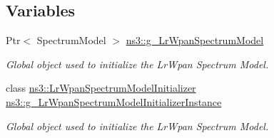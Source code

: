 \subsection*{Variables}
\begin{DoxyCompactItemize}
\item 
Ptr$<$ Spectrum\+Model $>$ \hyperlink{namespacens3_a42737ccd2a2a0c75325fbf6abfffda10}{ns3\+::g\+\_\+\+Lr\+Wpan\+Spectrum\+Model}
\begin{DoxyCompactList}\small\item\em Global object used to initialize the Lr\+Wpan Spectrum Model. \end{DoxyCompactList}\item 
class \hyperlink{classns3_1_1LrWpanSpectrumModelInitializer}{ns3\+::\+Lr\+Wpan\+Spectrum\+Model\+Initializer} \hyperlink{group__lr-wpan_ga392425659812b34efb80b778be4f0ec9}{ns3\+::g\+\_\+\+Lr\+Wpan\+Spectrum\+Model\+Initializer\+Instance}
\begin{DoxyCompactList}\small\item\em Global object used to initialize the Lr\+Wpan Spectrum Model. \end{DoxyCompactList}\end{DoxyCompactItemize}
